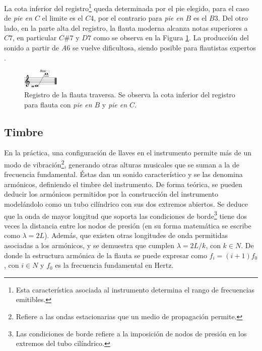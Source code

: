 \documentclass
  [ams,pdfout]%
	{aeslac}
\begin{document}
%
La cota inferior del registro\footnote{Esta característica asociada al instrumento determina el rango de frecuencias emitibles.} queda determinada por el pie elegido, para el caso de \textit{pie en $C$} el limite es el $C4$, por el contrario para \textit{pie en $B$} es el $B3$. Del otro lado, en la parte alta del registro, la flauta moderna alcanza notas superiores a $C7$, en particular $C\#7$ y $D7$ como se observa en la Figura \ref{fig:registro_flauta}. La producción del sonido a partir de $A6$ se vuelve dificultosa, siendo posible para flautistas expertos \cite{samuel2002study}.

\begin{figure}[h!]
\begin{center}
\includegraphics[width=0.15\textwidth]{imagenes/registro_flauta} 
\caption{Registro de la flauta traversa. Se observa la cota inferior del registro para flauta con \textit{pie en $B$} y \textit{pie en $C$}.}
\label{fig:registro_flauta}
\end{center}
\end{figure} 

%
\subsection*{Timbre}

En la práctica, una configuración de llaves en el instrumento permite más de un modo de vibración\footnote{Refiere a las ondas estacionarias que un medio de propagación permite.}, generando otras alturas musicales que se suman a la de frecuencia fundamental. Éstas dan un sonido característico y se las denomina armónicos, definiendo el timbre del instrumento. De forma teórica, se pueden deducir los armónicos permitidos por la construcción del instrumento modelándolo como un tubo cilíndrico con sus dos extremos abiertos. Se deduce que la onda de mayor longitud que soporta las condiciones de borde\footnote{Las condiciones de borde refiere a la imposición de nodos de presión en los extremos del tubo cilíndrico.} tiene dos veces la distancia entre los nodos de presión (en su forma matemática se escribe como $\lambda=2L$). Además, que existen otras longitudes de onda permitidas asociadas a los armónicos, y se demuestra que cumplen $\lambda=2L/k$, con $k \in N$. De donde la estructura armónica de la flauta se puede expresar como $f_{i}=(i+1)f_{0}$, con $i \in N$ y $f_{0}$ es la frecuencia fundamental en Hertz. 
\end{document}
